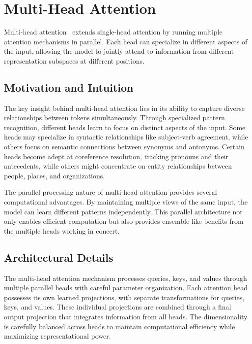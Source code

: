 \section{Multi-Head Attention}
\label{sec:multi_head_attention}

\noindent
Multi-head attention~\cite{vaswani2017attention,devlin2018bert} extends single-head attention by running multiple attention mechanisms in parallel. Each head can specialize in different aspects of the input, allowing the model to jointly attend to information from different representation subspaces at different positions.

\subsection{Motivation and Intuition}
\noindent
The key insight behind multi-head attention lies in its ability to capture diverse relationships between tokens simultaneously. Through specialized pattern recognition, different heads learn to focus on distinct aspects of the input. Some heads may specialize in syntactic relationships like subject-verb agreement, while others focus on semantic connections between synonyms and antonyms. Certain heads become adept at coreference resolution, tracking pronouns and their antecedents, while others might concentrate on entity relationships between people, places, and organizations.

The parallel processing nature of multi-head attention provides several computational advantages. By maintaining multiple views of the same input, the model can learn different patterns independently. This parallel architecture not only enables efficient computation but also provides ensemble-like benefits from the multiple heads working in concert.

\subsection{Architectural Details}
\noindent
The multi-head attention mechanism processes queries, keys, and values through multiple parallel heads with careful parameter organization. Each attention head possesses its own learned projections, with separate transformations for queries, keys, and values. These individual projections are combined through a final output projection that integrates information from all heads. The dimensionality is carefully balanced across heads to maintain computational efficiency while maximizing representational power.

